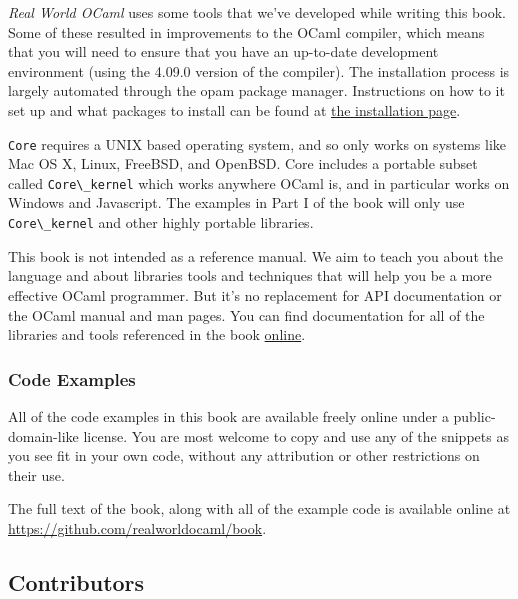 \emph{Real World OCaml} uses some tools that we've developed while
writing this book. Some of these resulted in improvements to the OCaml
compiler, which means that you will need to ensure that you have an
up-to-date development environment (using the 4.09.0 version of the
compiler). The installation process is largely automated through the
opam package manager. Instructions on how to it set up and what packages
to install can be found at \href{install.html}{the installation
page}.

\passthrough{\lstinline!Core!} requires a UNIX based operating system,
and so only works on systems like Mac OS X, Linux, FreeBSD, and OpenBSD.
Core includes a portable subset called
\passthrough{\lstinline!Core\_kernel!} which works anywhere OCaml is,
and in particular works on Windows and Javascript. The examples in Part
I of the book will only use \passthrough{\lstinline!Core\_kernel!} and
other highly portable libraries.

This book is not intended as a reference manual. We aim to teach you
about the language and about libraries tools and techniques that will
help you be a more effective OCaml programmer. But it's no replacement
for API documentation or the OCaml manual and man pages. You can find
documentation for all of the libraries and tools referenced in the book
\href{https://ocaml.janestreet.com/ocaml-core/}{online}.

\hypertarget{code-examples}{%
\subsubsection{Code Examples}\label{code-examples}}

All of the code examples in this book are available freely online under
a public-domain-like license. You are most welcome to copy and use any
of the snippets as you see fit in your own code, without any attribution
or other restrictions on their use.

The full text of the book, along with all of the example code is
available online at
\href{https://github.com/realworldocaml/book}{https://github.com/realworldocaml/book}.

\hypertarget{contributors}{%
\subsection{Contributors}\label{contributors}}

